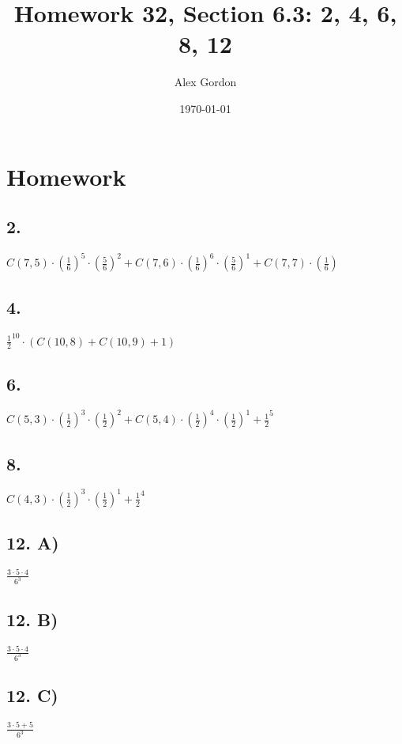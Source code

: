 \documentclass[12]{scrartcl}
\begin{document}
\title{Homework 32, Section 6.3: 2, 4, 6, 8, 12}
\author{Alex Gordon}
\date{\today}
\maketitle
\section*{Homework}
\subsection*{2.}
$C(7,5) \cdot (\frac{1}{6})^5 \cdot (\frac{5}{6})^2 + C(7,6) \cdot (\frac{1}{6})^6 \cdot (\frac{5}{6})^1 + C(7,7) \cdot (\frac{1}{6})$
\subsection*{4.}
$\frac{1}{2}^{10} \cdot (C(10,8) + C(10,9) + 1)$
\subsection*{6.}
$ C(5,3) \cdot (\frac{1}{2})^3 \cdot (\frac{1}{2})^2 + C(5,4) \cdot (\frac{1}{2})^4 \cdot (\frac{1}{2})^1 + \frac{1}{2}^5$
\subsection*{8.}
$C(4,3) \cdot (\frac{1}{2})^3 \cdot (\frac{1}{2})^1 + \frac{1}{2}^4$
\subsection*{12. A)}
$\frac{3 \cdot 5 \cdot 4}{6^3}$
\subsection*{12. B)}
$\frac{3 \cdot 5 \cdot 4}{6^3}$
\subsection*{12. C)}
$\frac{3 \cdot 5 + 5}{6^3}$
\end{document}
